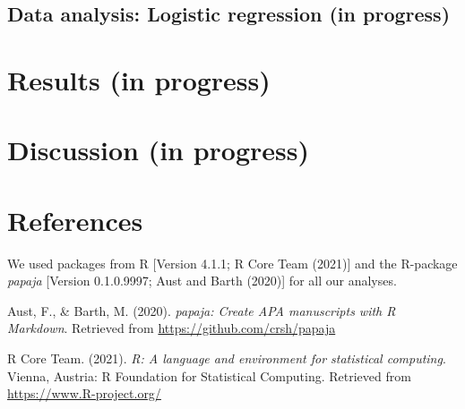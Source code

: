 \documentclass[
  english,
  man]{apa6}
\newlength{\cslhangindent}
\newlength{\cslentryspacingunit} %
\newenvironment{CSLReferences}[2] %
 {%
  \setlength{\parindent}{0pt}
  \ifodd #1
  \let\oldpar\par
  \def\par{\hangindent=\cslhangindent\oldpar}
  \fi
  \setlength{\parskip}{#2\cslentryspacingunit}
 }%
 {}
\begin{document}
\hypertarget{data-analysis-logistic-regression-in-progress}{%
\subsection{Data analysis: Logistic regression (in progress)}\label{data-analysis-logistic-regression-in-progress}}

\hypertarget{results-in-progress}{%
\section{Results (in progress)}\label{results-in-progress}}

\hypertarget{discussion-in-progress}{%
\section{Discussion (in progress)}\label{discussion-in-progress}}

\newpage

\hypertarget{references}{%
\section{References}\label{references}}

We used packages from R {[}Version 4.1.1; R Core Team (2021){]} and the R-package \emph{papaja} {[}Version 0.1.0.9997; Aust and Barth (2020){]} for all our analyses.

\begingroup
\setlength{\parindent}{-0.5in}
\setlength{\leftskip}{0.5in}

\hypertarget{refs}{}
\begin{CSLReferences}{1}{0}
\leavevmode{}%
Aust, F., \& Barth, M. (2020). \emph{{papaja}: {Create} {APA} manuscripts with {R Markdown}}. Retrieved from \url{https://github.com/crsh/papaja}

\leavevmode{}%
R Core Team. (2021). \emph{R: A language and environment for statistical computing}. Vienna, Austria: R Foundation for Statistical Computing. Retrieved from \url{https://www.R-project.org/}

\end{CSLReferences}

\endgroup
\end{document}
